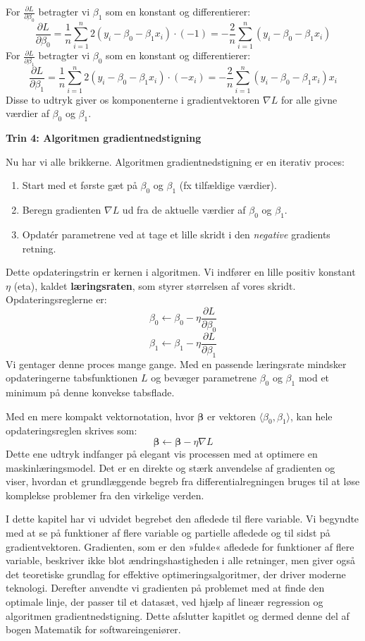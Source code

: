 \begin{solution}
For \(\frac{\partial L}{\partial \beta_0}\) betragter vi \(\beta_1\) som en konstant og differentierer:
\[
\frac{\partial L}{\partial \beta_0} = \frac{1}{n} \sum_{i=1}^{n} 2(y_i - \beta_0 - \beta_1 x_i) \cdot (-1) = -\frac{2}{n} \sum_{i=1}^{n} (y_i - \beta_0 - \beta_1 x_i)
\]
For \(\frac{\partial L}{\partial \beta_1}\) betragter vi \(\beta_0\) som en konstant og differentierer:
\[
\frac{\partial L}{\partial \beta_1} = \frac{1}{n} \sum_{i=1}^{n} 2(y_i - \beta_0 - \beta_1 x_i) \cdot (-x_i) = -\frac{2}{n} \sum_{i=1}^{n} (y_i - \beta_0 - \beta_1 x_i) x_i
\]
Disse to udtryk giver os komponenterne i gradientvektoren \(\nabla L\) for alle givne værdier af \(\beta_0\) og \(\beta_1\).

\vspace{1em}
\textbf{Trin 4: Algoritmen gradientnedstigning}

Nu har vi alle brikkerne. Algoritmen gradientnedstigning er en iterativ proces:
\begin{enumerate}
    \item Start med et første gæt på \(\beta_0\) og \(\beta_1\) (fx tilfældige værdier).
    \item Beregn gradienten \(\nabla L\) ud fra de aktuelle værdier af \(\beta_0\) og \(\beta_1\).
    \item Opdatér parametrene ved at tage et lille skridt i den \emph{negative} gradients retning.
\end{enumerate}
Dette opdateringstrin er kernen i algoritmen. Vi indfører en lille positiv konstant \(\eta\) (eta), kaldet \textbf{læringsraten}, som styrer størrelsen af vores skridt. Opdateringsreglerne er:
\[
\beta_0 \leftarrow \beta_0 - \eta \frac{\partial L}{\partial \beta_0}
\]
\[
\beta_1 \leftarrow \beta_1 - \eta \frac{\partial L}{\partial \beta_1}
\]
Vi gentager denne proces mange gange. Med en passende læringsrate mindsker opdateringerne tabsfunktionen \(L\) og bevæger parametrene \(\beta_0\) og \(\beta_1\) mod et minimum på denne konvekse tabsflade.

Med en mere kompakt vektornotation, hvor \(\boldsymbol{\beta}\) er vektoren \(\langle \beta_0, \beta_1 \rangle\), kan hele opdateringsreglen skrives som:
\[
\boldsymbol{\beta} \leftarrow \boldsymbol{\beta} - \eta \nabla L
\]
Dette ene udtryk indfanger på elegant vis processen med at optimere en maskinlæringsmodel. Det er en direkte og stærk anvendelse af gradienten og viser, hvordan et grundlæggende begreb fra differentialregningen bruges til at løse komplekse problemer fra den virkelige verden. \end{solution}

I dette kapitel har vi udvidet begrebet den afledede til flere variable. Vi begyndte med at se på funktioner af flere variable og partielle afledede og til sidst på gradientvektoren. Gradienten, som er den »fulde« afledede for funktioner af flere variable, beskriver ikke blot ændringshastigheden i alle retninger, men giver også det teoretiske grundlag for effektive optimeringsalgoritmer, der driver moderne teknologi. Derefter anvendte vi gradienten på problemet med at finde den optimale linje, der passer til et datasæt, ved hjælp af lineær regression og algoritmen gradientnedstigning. Dette afslutter kapitlet og dermed denne del af bogen Matematik for softwareingeniører.
